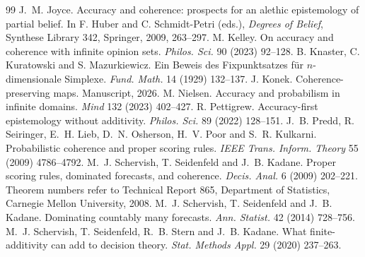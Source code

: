 \documentclass[11pt]{article}
\theoremstyle{definition}
\theoremstyle{remark}
\begin{document}
\begin{thebibliography}{99}
 J.~M. Joyce. Accuracy and coherence: prospects for an alethic epistemology of partial belief. In F. Huber and C. Schmidt-Petri (eds.), \emph{Degrees of Belief}, Synthese Library 342, Springer, 2009, 263--297.
 M. Kelley. On accuracy and coherence with infinite opinion sets. \emph{Philos. Sci.} 90 (2023) 92--128.
 B. Knaster, C. Kuratowski and S. Mazurkiewicz. Ein Beweis des Fixpunktsatzes f\"ur $n$-dimensionale Simplexe. \emph{Fund. Math.} 14 (1929) 132--137.
 J. Konek. Coherence-preserving maps. Manuscript, 2026.
 M. Nielsen. Accuracy and probabilism in infinite domains. \emph{Mind} 132 (2023) 402--427.
 R. Pettigrew. Accuracy-first epistemology without additivity. \emph{Philos. Sci.} 89 (2022) 128--151.
 J.~B. Predd, R. Seiringer, E.~H. Lieb, D.~N. Osherson, H.~V. Poor and S.~R. Kulkarni. Probabilistic coherence and proper scoring rules. \emph{IEEE Trans. Inform. Theory} 55 (2009) 4786--4792.
 M.~J. Schervish, T. Seidenfeld and J.~B. Kadane. Proper scoring rules, dominated forecasts, and coherence. \emph{Decis. Anal.} 6 (2009) 202--221. Theorem numbers refer to Technical Report 865, Department of Statistics, Carnegie Mellon University, 2008.
 M.~J. Schervish, T. Seidenfeld and J.~B. Kadane. Dominating countably many forecasts. \emph{Ann. Statist.} 42 (2014) 728--756.
 M.~J. Schervish, T. Seidenfeld, R.~B. Stern and J.~B. Kadane. What finite-additivity can add to decision theory. \emph{Stat. Methods Appl.} 29 (2020) 237--263.
\end{thebibliography}
\end{document}
